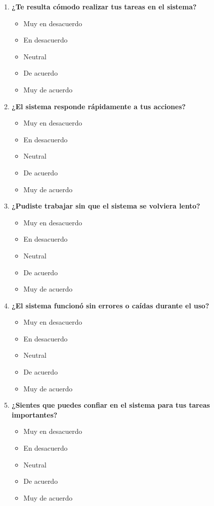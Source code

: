 \documentclass[conference]{IEEEtran}
\begin{document}
\begin{enumerate}
    \item \textbf{¿Te resulta cómodo realizar tus tareas en el sistema?}
        \begin{itemize}
            \item Muy en desacuerdo
            \item En desacuerdo
            \item Neutral
            \item De acuerdo
            \item Muy de acuerdo
        \end{itemize}
        
    \item \textbf{¿El sistema responde rápidamente a tus acciones?}
        \begin{itemize}
            \item Muy en desacuerdo
            \item En desacuerdo
            \item Neutral
            \item De acuerdo
            \item Muy de acuerdo
        \end{itemize}
        
    \item \textbf{¿Pudiste trabajar sin que el sistema se volviera lento?}
        \begin{itemize}
            \item Muy en desacuerdo
            \item En desacuerdo
            \item Neutral
            \item De acuerdo
            \item Muy de acuerdo
        \end{itemize}
        
    \item \textbf{¿El sistema funcionó sin errores o caídas durante el uso?}
        \begin{itemize}
            \item Muy en desacuerdo
            \item En desacuerdo
            \item Neutral
            \item De acuerdo
            \item Muy de acuerdo
        \end{itemize}
        
    \item \textbf{¿Sientes que puedes confiar en el sistema para tus tareas importantes?}
        \begin{itemize}
            \item Muy en desacuerdo
            \item En desacuerdo
            \item Neutral
            \item De acuerdo
            \item Muy de acuerdo
        \end{itemize}
        

\end{enumerate}
\end{document}
